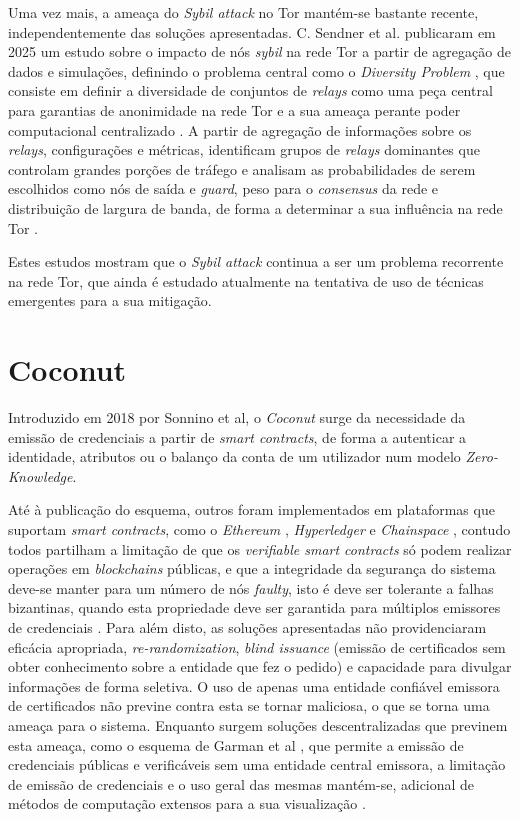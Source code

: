 Uma vez mais, a ameaça do \textit{Sybil attack} no Tor mantém-se bastante recente, independentemente das soluções apresentadas. C. Sendner et al. publicaram em 2025 um estudo sobre o impacto de nós \textit{sybil} na rede Tor a partir de agregação de dados e simulações, definindo o problema central como o \textit{Diversity Problem} \cite{10.1007/978-3-031-92886-4_13}, que consiste em definir a diversidade de conjuntos de \textit{relays} como uma peça central para garantias de anonimidade na rede Tor e a sua ameaça perante poder computacional centralizado \cite{10.1007/978-3-031-92886-4_13}. A partir de agregação de informações sobre os \textit{relays}, configurações e métricas, identificam grupos de \textit{relays} dominantes que controlam grandes porções de tráfego e analisam as probabilidades de serem escolhidos como nós de saída e \textit{guard}, peso para o \textit{consensus} da rede e distribuição de largura de banda, de forma a determinar a sua influência na rede Tor \cite{10.1007/978-3-031-92886-4_13}.

Estes estudos mostram que o \textit{Sybil attack} continua a ser um problema recorrente na rede Tor, que ainda é estudado atualmente na tentativa de uso de técnicas emergentes para a sua mitigação.

\section{Coconut}
\label{sec:coconut}

Introduzido em 2018 por Sonnino et al, o \textit{Coconut} surge da necessidade da emissão de credenciais a partir de \textit{smart contracts}, de forma a autenticar a identidade, atributos ou o balanço da conta de um utilizador num modelo \textit{Zero-Knowledge}.

Até à publicação do esquema, outros foram implementados em plataformas que suportam \textit{smart contracts}, como o \textit{Ethereum} \cite{wood2014ethereum}, \textit{Hyperledger} \cite{cachin2016architecture} e \textit{Chainspace} \cite{al2017chainspace}, contudo todos partilham a limitação de que os \textit{verifiable smart contracts} só podem realizar operações em \textit{blockchains} públicas, e que a integridade da segurança do sistema deve-se manter para um número de nós \textit{faulty}, isto é deve ser tolerante a falhas bizantinas, quando esta propriedade deve ser garantida para múltiplos emissores de credenciais \cite{sonnino2018coconut}. Para além disto, as soluções apresentadas não providenciaram eficácia apropriada, \textit{re-randomization}, \textit{blind issuance} (emissão de certificados sem obter conhecimento sobre a entidade que fez o pedido) e capacidade para divulgar informações de forma seletiva. O uso de apenas uma entidade confiável emissora de certificados não previne contra esta se tornar maliciosa, o que se torna uma ameaça para o sistema. Enquanto surgem soluções descentralizadas que previnem esta ameaça, como o esquema de Garman et al \cite{garman2013decentralized}, que permite a emissão de credenciais públicas e verificáveis sem uma entidade central emissora, a limitação de emissão de credenciais e o uso geral das mesmas mantém-se, adicional de métodos de computação extensos para a sua visualização \cite{sonnino2018coconut}.


